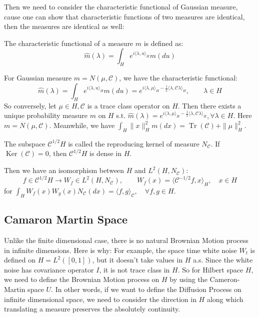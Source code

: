 Then we need to consider the characteristic functional of Gaussian measure, cause one can show that characteristic functions of two measures are identical, then the measures are identical as well:
\begin{definition}
  The characteristic functional of a measure $m$ is defined as:
  \begin{equation}
    \hat{m}(\lambda) = \int_H e^{i\langle \lambda, u\rangle_H} m(du)
  \end{equation}
\end{definition}
For Gaussian measure $m=N(\mu, \mathcal{C})$, we have the characteristic functional:
\begin{equation}
  \hat{m}(\lambda) = \int_H e^{i\langle \lambda, u\rangle_H} m(du) = e^{i\langle \lambda, \mu\rangle_H-\frac{1}{2}\langle \lambda, \mathcal{C}\lambda\rangle_H}, \qquad \lambda\in H
\end{equation}
So conversely, let $\mu\in H, \mathcal{C}$ is a trace class operator on $H$. Then there exists a unique probability measure $m$ on $H$ s.t. $\hat{m}(\lambda) = e^{i\langle \lambda, \mu\rangle_H-\frac{1}{2}\langle \lambda, \mathcal{C}\lambda\rangle_H}, \forall \lambda\in H$. Here $m=N(\mu, \mathcal{C})$. Meanwhile, we have $\int_H \|x\|^2_H m(dx) =\operatorname{Tr}(\mathcal{C}) + \|\mu\|^2_H$.


\begin{definition}
    The subspace $\mathcal{C}^{1/2}H$ is called the reproducing kernel of measure $N_{\mathcal{C}}$. If $\operatorname{Ker}(\mathcal{C})=0$, then $\mathcal{C}^{1/2}H$ is dense in $H$. 
\end{definition}
Then we have an isomorphism between $H$ and $L^2(H, N_{\mathcal{C}})$:
\begin{equation}
    f\in \mathcal{C}^{1/2}H \rightarrow W_f\in L^2(H, N_{\mathcal{C}}), \qquad W_f(x)=\langle \mathcal{C}^{-1/2}f, x\rangle_H,\quad x\in H
\end{equation}
for $\int_H W_f(x) W_g(x) N_{\mathcal{C}}(dx) = \langle f, g\rangle_{\mathcal{C}}, \quad \forall f, g\in H$.

\subsection{Camaron Martin Space}
Unlike the finite dimensional case, there is no natural Brownian Motion process in infinite dimensions. 
Here is why: For example, the space time white noise $W_t$ is defined on $H=L^2([0, 1])$, but it doesn't take values in $H$ a.s.
Since the white noise has covariance operator $I$, it is not trace class in $H$. 
So for Hilbert space $H$, we need to define the Brownian Motion process on $H$ by using the Cameron-Martin space $U$.
In other words, if we want to define the Diffusion Process on infinite dimensional space, 
we need to consider the direction in $H$ along which translating a measure preserves the absolutely continuity.


